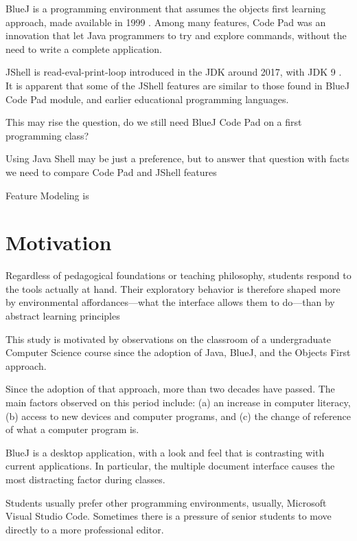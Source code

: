 \documentclass{article}
\begin{document}
BlueJ is a programming environment that assumes the objects first learning approach, made available in 1999 \cite{barnes2008objects}\cite{bluej_paper}. Among many features, Code Pad was an innovation that let Java programmers to try and explore commands, without the need to write a complete application.


JShell is read-eval-print-loop introduced in the JDK around 2017, with JDK 9 \cite{jshell_docs}. It is apparent that some of the JShell features are similar to those found in BlueJ Code Pad module, and earlier educational programming languages. 

This may rise the question, do we still need BlueJ Code Pad on a first programming class?


Using Java Shell may be just a preference, but to answer that question with facts we need to 
compare Code Pad and JShell features

Feature Modeling is

\section{Motivation}

Regardless of pedagogical foundations or teaching philosophy, students respond to the tools actually at hand.
Their exploratory behavior is therefore shaped more by environmental affordances—what the interface allows them to do—than by abstract learning principles

This study is motivated by observations on the classroom of a undergraduate Computer Science course since the adoption of Java, BlueJ, and the Objects First approach.

Since the adoption of that approach, more than two decades have passed. The main factors observed on this period include: (a) an increase in computer literacy, (b) access to new devices and computer programs, and (c) the change of reference of what a computer program is.

BlueJ is a desktop application, with a look and feel that is contrasting with current applications. In particular, the multiple document interface causes the most distracting factor during classes.

Students usually prefer other programming environments, usually, Microsoft Visual Studio Code. Sometimes there is a pressure of senior students to move directly to a more professional editor. 
\end{document}
